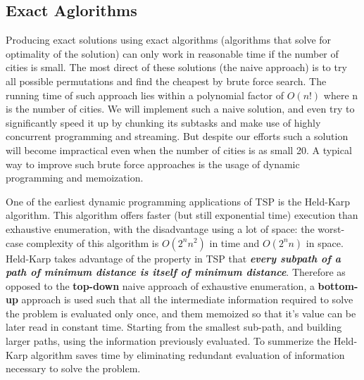 \documentclass[11pt]{article}
\begin{document}
\subsection{Exact Aglorithms} Producing exact solutions using exact algorithms (algorithms that solve for optimality of the solution) can only work in reasonable time if the number of cities is small. The most direct of these solutions (the naive approach) is to try all possible permutations and find the cheapest by brute force search. The running time of such approach lies within a polynomial factor of $O(n!)$ where n is the number of cities. We will implement such a naive solution, and even try to significantly speed it up by chunking its subtasks and make use of highly concurrent programming and streaming. But despite our efforts such a solution will become impractical even when the number of cities is as small 20. A typical way to improve such brute force approaches is the usage of dynamic programming and memoization. \par
 One of the earliest dynamic programming applications of TSP is the Held-Karp algorithm. This algorithm offers faster (but still exponential time) execution than exhaustive enumeration, with the disadvantage using a lot of space: the worst-case complexity of this algorithm is $O(2^n n^2)$ in time and $O(2^n n)$ in space. Held-Karp takes advantage of the property in TSP that \textbf{\textit{every subpath of a path of minimum distance is itself of minimum distance}}. Therefore as opposed to the \textbf{top-down} naive approach of exhaustive enumeration, a \textbf{bottom-up} approach is used such that all the intermediate information required to solve the problem is evaluated only once, and them memoized so that it's value can be later read in constant time. Starting from the smallest sub-path, and building larger paths, using the information previously evaluated. To summerize the Held-Karp algorithm saves time by eliminating redundant evaluation of information necessary to solve the problem.


\newpage
\end{document}
